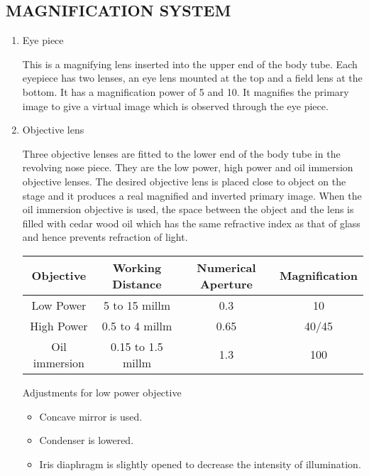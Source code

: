 \documentclass[12pt]{book}
\begin{document}
						\subsection{MAGNIFICATION SYSTEM}
						\begin{enumerate}

						\item{Eye piece
							\par This is a magnifying lens inserted into the upper end of the body tube. Each eyepiece has two lenses, an eye lens mounted at the top and a field lens at the bottom. It has a magnification power of 5 and 10. It magnifies the primary image to give a virtual image which is observed through the eye piece.}
							\item{Objective lens

								\par Three objective lenses are fitted to the lower end of the body tube in the revolving nose piece. They are the low power, high power and oil immersion objective lenses. The desired objective lens is placed close to object on the stage and it produces a real magnified and inverted primary image. When the oil immersion objective is used, the space between the object and the lens is filled with cedar wood oil which has the same refractive index as that of glass and hence prevents refraction of light.\newline
									\begin{tabular}{c | c | c | c}
								\hline
									Objective & Working Distance & Numerical Aperture &Magnification\\
									\hline
									Low Power & 5 to 15 millm & 0.3 & 10\\
									\hline
									High Power
									&0.5 to 4 millm
									&0.65
									&40/45 \\
									\hline

									Oil immersion
									&0.15 to 1.5 millm
									&1.3
									&100 \\

									\hline





									\end{tabular}

								\par
									Adjustments for low power objective
									\begin{itemize}
								\item {Concave mirror is used.}
								\item {Condenser is lowered.}
								\item {Iris diaphragm is slightly opened to decrease the intensity of illumination.}
								\end{itemize}

}
\end{enumerate}
\end{document}
